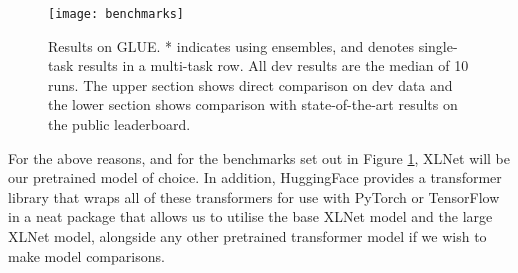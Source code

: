 \documentclass[12pt, a4paper]{article}
\begin{document}
\begin{figure}
	\texttt{[image: benchmarks]}
	\caption{Results on GLUE. * indicates using ensembles, and \dag  denotes single-task results in a multi-task row. All dev results are the median of 10 runs. The upper section shows direct comparison on dev data and the lower section shows comparison with state-of-the-art results on the public leaderboard.}
	\label{benchmarks}
\end{figure}

For the above reasons, and for the benchmarks set out in Figure \ref{benchmarks}, XLNet will be our pretrained model of choice. In addition, HuggingFace \cite{Wolf2019HuggingFacesTS} provides a transformer library that wraps all of these transformers for use with PyTorch or TensorFlow in a neat package that allows us to utilise the base XLNet model and the large XLNet model, alongside any other pretrained transformer model if we wish to make model comparisons. 



\end{document}
